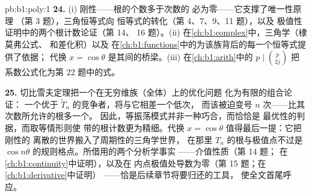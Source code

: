 \begin{solution}{pb:b1:poly:1}
\textbf{24.} (i) 刚性——根的个数多于次数的
必为零——它支撑了唯一性原理
（第 3 题），三角恒等式向
恒等式的转化（第 4、7、9、11 题），以及
极值性证明中的两个根计数论证（第 14、
16 题）。(ii) 在\cref{ch:b1:complex}中，三角学（棣莫弗公式、
和差化积）以及
在\cref{ch:b1:functions}中的为该族背后的每一个恒等式提供了依据；
代换 $x = \cos\theta$ 是其间的桥梁。(iii)
在\cref{ch:b1:arith}中的 $p \mid \binom p{2j}$ 把
系数公式化为第 22 题中的式。

\textbf{25.} 切比雪夫定理把一个在无穷维族（全体）上的优化问题
化为有限的组合论证：
一个优于 $\widetilde T_n$ 的竞争者，将与它相差一个低次，
而该被迫变号
$n$ 次——比其次数所允许的根多一个。
因此，等振荡模式并非一种巧合，而恰恰是
最优性的判据，而取等情形则使
带的根计数更为精细。代换 $x =
\cos\theta$ 值得最后一提：它把刚性的
离散的世界搬入了周期性的三角学世界，
在那里 $T_n$ 的根与极值点不过是
$\cos n\theta$ 的规则格点。所借用的两个分析学事实
——介值性质（第 14 题；
在\cref{ch:b1:continuity}中证明），以及在
内点极值处导数为零（第 15 题；在\cref{ch:b1:derivative}中证明）
——恰是后续章节将要归还的工具，
使全文首尾呼应。
\end{solution}
